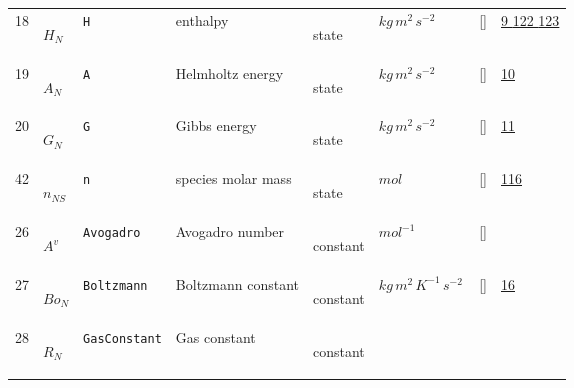 \begin{longtable}{|p{1cm}|p{3cm}|p{3cm}|p{7cm}|p{3.0cm}|p{3cm}|p{2cm}|p{1cm}|}
    18
             & \hypertarget{"v:18"}{ $ {H}{_{N}} $}
             & \verb|H|
             & enthalpy
             & \begin{lay}state \end{lay}
             & $ kg \,m^{2} \,s^{-2} \, $
             & []
             & \hyperlink{"e:9"}{ 9 }
                 \hyperlink{"e:122"}{ 122 }
                 \hyperlink{"e:123"}{ 123 }
                 \\
    19
             & \hypertarget{"v:19"}{ $ {A}{_{N}} $}
             & \verb|A|
             & Helmholtz energy
             & \begin{lay}state \end{lay}
             & $ kg \,m^{2} \,s^{-2} \, $
             & []
             & \hyperlink{"e:10"}{ 10 }
                 \\
    20
             & \hypertarget{"v:20"}{ $ {G}{_{N}} $}
             & \verb|G|
             & Gibbs energy
             & \begin{lay}state \end{lay}
             & $ kg \,m^{2} \,s^{-2} \, $
             & []
             & \hyperlink{"e:11"}{ 11 }
                 \\
    42
             & \hypertarget{"v:42"}{ $ {n}{_{{N S}}} $}
             & \verb|n|
             & species molar mass
             & \begin{lay}state \end{lay}
             & $ mol \, $
             & []
             & \hyperlink{"e:116"}{ 116 }
                 \\
    26
             & \hypertarget{"v:26"}{ $ {A^v}{_{}} $}
             & \verb|Avogadro|
             & Avogadro number
             & \begin{lay}constant \end{lay}
             & $ mol^{-1} \, $
             & []
             & \\
    27
             & \hypertarget{"v:27"}{ $ {Bo}{_{N}} $}
             & \verb|Boltzmann|
             & Boltzmann constant
             & \begin{lay}constant \end{lay}
             & $ kg \,m^{2} \,K^{-1} \,s^{-2} \, $
             & []
             & \hyperlink{"e:16"}{ 16 }
                 \\
    28
             & \hypertarget{"v:28"}{ $ {R}{_{N}} $}
             & \verb|GasConstant|
             & Gas constant
             & \begin{lay}constant \end{lay}

\end{longtable}
